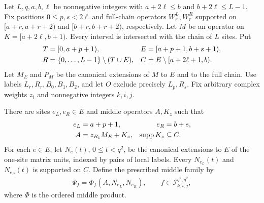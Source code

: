 \begin{lemma}
    \label{thm:selected_coefficient_prescribed_middle}
    \leanok
    Let $L,q,a,b,\ell$ be nonnegative integers with
    $a+2\ell\le b$ and $b+2\ell\le L-1$.
    Fix positions $0\le p,s<2\ell$ and full-chain operators $W^L_r,W^R_r$
    supported on $[a+r,a+r+2)$ and
    $[b+r,b+r+2)$, respectively.
    Let $M$ be an operator on $K=[a+2\ell,b+1)$.
    Every interval is intersected with the chain of $L$ sites.
    Put
    \begin{align}
        T & =[0,a+p+1),                          & E &
        =[a+p+1,b+s+1),\notag                          \\
        R & =\{0,\ldots,L-1\}\setminus(T\cup E), &
        C & =E\setminus[a+2\ell+1,b).
        \label{eq:selected_coefficient_regions}
    \end{align}
    Let $M_E$ and $P_M$ be the canonical extensions of $M$ to $E$ and to the
    full chain. Use labels $L_r,R_r,B_0,B_1,B_2$, and let $O$ exclude precisely
    $L_p,R_s$. Fix arbitrary complex weights $z_i$ and nonnegative integers
    $k,i,j$.

    There are sites $e_L,e_R\in E$ and middle operators $A,K_z$ such that
    \begin{align}
        e_L & =a+p+1,          & e_R                    & =b+s,\notag  \\
        A   & =z_{B_1}M_E+K_z, & \operatorname{supp}K_z & \subseteq C.
        \label{eq:selected_coefficient_middle_data}
    \end{align}
    For each $e\in E$, let $N_e(t)$, $0\le t<q^2$, be the canonical
    extensions to $E$ of the one-site matrix units, indexed by pairs of local
    labels. Every $N_{e_L}(t)$ and $N_{e_R}(t)$ is supported on $C$.
    Define the prescribed middle family by
    \begin{align}
        \Psi_f=\Phi_f(A,N_{e_L},N_{e_R}),
        \qquad f\in\mathcal I_{k,i,j}^{q^2,q^2},
        \label{eq:selected_coefficient_middle_family}
    \end{align}
    where $\Phi$ is the ordered middle product.


\end{lemma}
